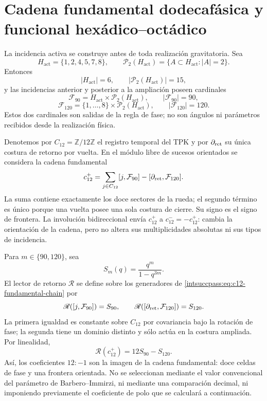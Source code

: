 \section{Cadena fundamental dodecafásica y funcional hexádico--octádico}

La incidencia activa se construye antes de toda realización gravitatoria.
Sea
\[
 H_{\mathrm{act}}=\{1,2,4,5,7,8\},
 \qquad
 \mathcal P_2(H_{\mathrm{act}})
 =\{A\subset H_{\mathrm{act}}:|A|=2\}.
\]
Entonces
\[
 |H_{\mathrm{act}}|=6,
 \qquad
 |\mathcal P_2(H_{\mathrm{act}})|=15,
\]
y las incidencias anterior y posterior a la ampliación poseen cardinales
\[
 \mathcal F_{90}=H_{\mathrm{act}}\times
 \mathcal P_2(H_{\mathrm{act}}),
 \qquad |\mathcal F_{90}|=90,
\]
\[
 \mathcal F_{120}=\{1,\ldots,8\}\times
 \mathcal P_2(H_{\mathrm{act}}),
 \qquad |\mathcal F_{120}|=120.
\]
Estos dos cardinales son salidas de la regla de fase; no son ángulos ni
parámetros recibidos desde la realización física.

Denotemos por \(C_{12}=\mathbb Z/12\mathbb Z\) el registro temporal del TPK y
por \(\partial_{\rm ret}\) su única costura de retorno por vuelta. En el
módulo libre de sucesos orientados se considera la cadena fundamental
\begin{equation}
 c_{12}^{+}
 =\sum_{j\in C_{12}}[j,\mathcal F_{90}]
  -[\partial_{\rm ret},\mathcal F_{120}].
 \label{intsuccpass:eq:c12-fundamental-chain}
\end{equation}
La suma contiene exactamente los doce sectores de la rueda; el segundo
término es único porque una vuelta posee una sola costura de cierre. Su signo
es el signo de frontera. La involución bidireccional envía
\(c_{12}^{+}\) a \(c_{12}^{-}=-c_{12}^{+}\): cambia la orientación de la
cadena, pero no altera sus multiplicidades absolutas ni sus tipos de
incidencia.

Para \(m\in\{90,120\}\), sea
\[
 S_m(q)=\frac{q^m}{1-q^{3m}}.
\]
El lector de retorno \(\mathscr R\) se define sobre los generadores de
\eqref{intsuccpass:eq:c12-fundamental-chain} por
\[
 \mathscr R([j,\mathcal F_{90}])=S_{90},
 \qquad
 \mathscr R([\partial_{\rm ret},\mathcal F_{120}])=S_{120}.
\]
La primera igualdad es constante sobre \(C_{12}\) por covariancia bajo la
rotación de fase; la segunda tiene un dominio distinto y sólo actúa en la
costura ampliada. Por linealidad,
\begin{equation}
 \boxed{\mathscr R(c_{12}^{+})=12S_{90}-S_{120}.}
 \label{intsuccpass:eq:dodecaphase-forces-12minus1}
\end{equation}
Así, los coeficientes \(12:-1\) son la imagen de la cadena fundamental: doce
celdas de fase y una frontera orientada. No se seleccionan mediante el valor
convencional del parámetro de Barbero--Immirzi, ni mediante una comparación
decimal, ni imponiendo previamente el coeficiente de polo que se calculará a
continuación.


